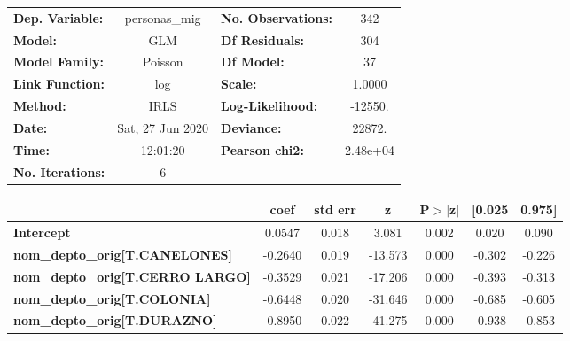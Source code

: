 \begin{center}
\begin{tabular}{lclc}
\toprule
\textbf{Dep. Variable:}                     &  personas\_mig   & \textbf{  No. Observations:  } &      342    \\
\textbf{Model:}                             &       GLM        & \textbf{  Df Residuals:      } &      304    \\
\textbf{Model Family:}                      &     Poisson      & \textbf{  Df Model:          } &       37    \\
\textbf{Link Function:}                     &       log        & \textbf{  Scale:             } &    1.0000   \\
\textbf{Method:}                            &       IRLS       & \textbf{  Log-Likelihood:    } &   -12550.   \\
\textbf{Date:}                              & Sat, 27 Jun 2020 & \textbf{  Deviance:          } &    22872.   \\
\textbf{Time:}                              &     12:01:20     & \textbf{  Pearson chi2:      } &  2.48e+04   \\
\textbf{No. Iterations:}                    &        6         & \textbf{                     } &             \\
\bottomrule
\end{tabular}
\begin{tabular}{lcccccc}
                                            & \textbf{coef} & \textbf{std err} & \textbf{z} & \textbf{P$> |$z$|$} & \textbf{[0.025} & \textbf{0.975]}  \\
\midrule
\textbf{Intercept}                          &       0.0547  &        0.018     &     3.081  &         0.002        &        0.020    &        0.090     \\
\textbf{nom\_depto\_orig[T.CANELONES]}      &      -0.2640  &        0.019     &   -13.573  &         0.000        &       -0.302    &       -0.226     \\
\textbf{nom\_depto\_orig[T.CERRO LARGO]}    &      -0.3529  &        0.021     &   -17.206  &         0.000        &       -0.393    &       -0.313     \\
\textbf{nom\_depto\_orig[T.COLONIA]}        &      -0.6448  &        0.020     &   -31.646  &         0.000        &       -0.685    &       -0.605     \\
\textbf{nom\_depto\_orig[T.DURAZNO]}        &      -0.8950  &        0.022     &   -41.275  &         0.000        &       -0.938    &       -0.853     \\

\end{tabular}
\end{center}
